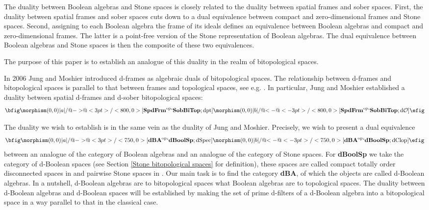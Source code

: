 \documentclass[11pt]{article}
\DeclareMathOperator{\dSpec}{dSpec}
\DeclareMathOperator{\dClop}{dClop}
\DeclareMathOperator{\dO}{d\mathcal{O}}
\DeclareMathOperator{\dpt}{dpt}
\theoremstyle{plain}
\theoremstyle{definition}
\begin{document}
The duality between Boolean algebras and Stone spaces is closely related to the duality between spatial frames and sober spaces. 
First, the duality between spatial frames and sober spaces cuts down to a dual equivalence between compact and zero-dimensional frames and Stone spaces. Second, assigning  to each Boolean algebra the frame of its ideals defines an equivalence between  Boolean algebras and  compact and zero-dimensional frames. The latter is a point-free version of the Stone representation of Boolean algebras. The dual equivalence between Boolean algebras and Stone spaces is then the  composite of these two equivalences.  
  
The purpose of this paper is to establish an analogue of this duality   in the realm of bitopological spaces. 

In 2006 Jung and Moshier \cite{JM2006} introduced   d-frames as algebraic duals of bitopological spaces. The relationship between d-frames and bitopological spaces is parallel to that between frames and topological spaces, see e.g.  \cite{Jakl,JM2006,Klinke}. In particular,  Jung and Moshier established a duality between spatial d-frames and d-sober bitopological spaces: 
$$\bfig\morphism(0,0)|a|/@{->}@<3pt>/<800,0>[{\bf SpdFrm}^{\rm op}`{\bf SobBiTop};\dpt] \morphism(0,0)|b|/@{<-}@<-3pt>/<800,0>[{\bf SpdFrm}^{\rm op}`{\bf SobBiTop};\dO] \efig$$
 
The duality we wish to establish is in the same vein as the duality of Jung and Moshier. Precisely, we wish to present a dual equivalence $$\bfig
\morphism(0,0)|a|/@{->}@<3pt>/<750,0>[{\bf dBA}^{\rm op}`{\bf dBoolSp};\dSpec ]
\morphism(0,0)|b|/@{<-}@<-3pt>/<750,0>[{\bf dBA}^{\rm op}`{\bf dBoolSp}; \dClop] \efig$$ between  an analogue of the category of Boolean algebras and an analogue of the category of Stone spaces. For {\bf dBoolSp} we take the category of d-Boolean spaces (see Section \ref{Stone bitopological spaces} for definition), these spaces are called compact totally order disconnected spaces in \cite{JM2006} and   pairwise Stone spaces in \cite{BBGK}. Our main task is to find the category {\bf dBA}, of which the objects are called d-Boolean algebras. In a nutshell, d-Boolean algebras are to bitopological spaces what Boolean algebras  are to topological spaces. The duality between d-Boolean algebras and d-Boolean spaces will be established by making the set of prime d-filters of a d-Boolean algebra into a bitopological space in a way parallel to that in the classical case. 
\end{document}
